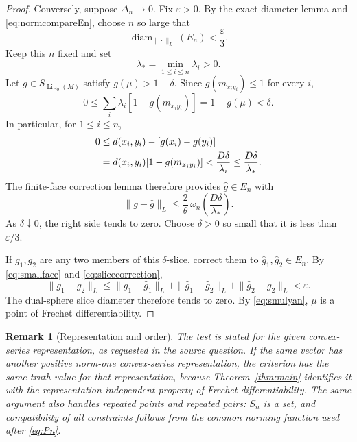 \documentclass[11pt]{article}
\newtheorem{remark}{Remark}
\newcommand{\Lip}{\operatorname{Lip}_0}
\newcommand{\diam}{\operatorname{diam}}
\begin{document}
\begin{proof}
Conversely, suppose $\Delta_n\to0$. Fix $\varepsilon>0$. By the exact
diameter lemma and \eqref{eq:normcompareEn}, choose $n$ so large that
\begin{equation}
 \diam_{\|\cdot\|_L}(E_n)<\frac{\varepsilon}{3}.
 \label{eq:smallface}
\end{equation}
Keep this $n$ fixed and set
\[
 \lambda_* =\min_{1\leq i\leq n}\lambda_i>0.
\]
Let $g\in S_{\Lip(M)}$ satisfy $g(\mu)>1-\delta$. Since
$g(m_{x_i y_i})\leq1$ for every $i$,
\begin{equation}
 0\leq\sum_i\lambda_i[1-g(m_{x_i y_i})]
 =1-g(\mu)<\delta.
 \label{eq:deficitsum}
\end{equation}
In particular, for $1\leq i\leq n$,
\begin{align}
 0&\leq d(x_i,y_i)-[g(x_i)-g(y_i)]\notag\\
 &=d(x_i,y_i)[1-g(m_{x_i y_i})]
 <\frac{D\delta}{\lambda_i}
 \leq\frac{D\delta}{\lambda_*}.
 \label{eq:individualdeficit}
\end{align}
The finite-face correction lemma therefore provides $\widehat g\in E_n$ with
\begin{equation}
 \|g-\widehat g\|_L
 \leq\frac{2}{\theta}\,
 \omega_n\!\left(\frac{D\delta}{\lambda_*}\right).
 \label{eq:slicecorrection}
\end{equation}
As $\delta\downarrow0$, the right side tends to zero. Choose $\delta>0$ so
small that it is less than $\varepsilon/3$.

If $g_1,g_2$ are any two members of this $\delta$-slice, correct them to
$\widehat g_1,\widehat g_2\in E_n$. By \eqref{eq:smallface} and
\eqref{eq:slicecorrection},
\[
 \|g_1-g_2\|_L
 \leq\|g_1-\widehat g_1\|_L
     +\|\widehat g_1-\widehat g_2\|_L
     +\|\widehat g_2-g_2\|_L
 <\varepsilon.
\]
The dual-sphere slice diameter therefore tends to zero. By
\eqref{eq:smulyan}, $\mu$ is a point of Frechet differentiability.
\end{proof}

\begin{remark}[Representation and order]
The test is stated for the given convex-series representation, as requested
in the source question. If the same vector has another positive norm-one
convex-series representation, the criterion has the same truth value for
that representation, because Theorem~\ref{thm:main} identifies it with the
representation-independent property of Frechet differentiability. The same
argument also handles repeated points and repeated pairs: $S_n$ is a set,
and compatibility of all constraints follows from the common norming
function used after \eqref{eq:Pn}.
\end{remark}
\end{document}
